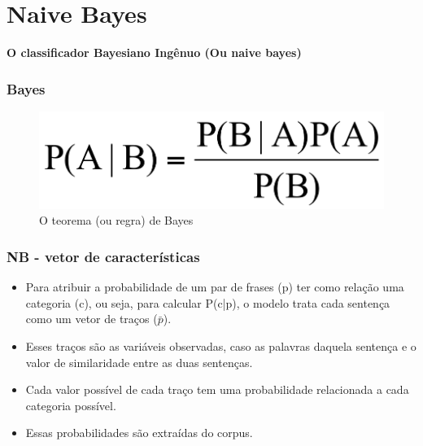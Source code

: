 \documentclass{beamer}
\begin{document}
\section{Naive Bayes}
	\begin{frame}
\centering \textbf{O classificador Bayesiano Ingênuo (Ou naive bayes)\\}
\end{frame}

\begin{frame}
\frametitle{Bayes}
\begin{figure}
\centering
\includegraphics[width=0.7\linewidth]{bayes-limpo}
\caption{O teorema (ou regra) de Bayes}
\label{fig:bayes-limpo}
\end{figure}

\end{frame}
\begin{frame}
\frametitle{NB - vetor de características}
\begin{itemize}
\item Para atribuir a probabilidade de um par de frases (p) ter como relação uma categoria (c), ou seja, para calcular P(c|p), o modelo trata cada sentença como um vetor de traços ($\bar{p}$).\\
\item Esses traços são as variáveis observadas, caso as palavras daquela sentença e o valor de similaridade entre as duas sentenças.\\
\item Cada valor possível de cada traço tem uma probabilidade relacionada a cada categoria possível.\\
\item Essas probabilidades são extraídas do corpus.\\
\end{itemize}
\end{frame}	
\end{document}

